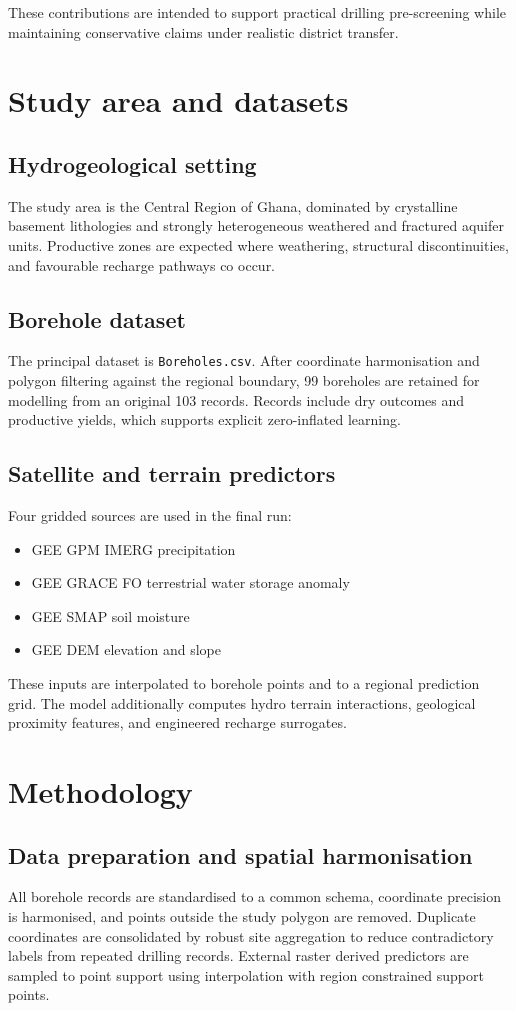 \documentclass[preprint,12pt]{elsarticle}
\begin{document}
These contributions are intended to support practical drilling pre-screening while maintaining conservative claims under realistic district transfer.

\section{Study area and datasets}
\subsection{Hydrogeological setting}
The study area is the Central Region of Ghana, dominated by crystalline basement lithologies and strongly heterogeneous weathered and fractured aquifer units. Productive zones are expected where weathering, structural discontinuities, and favourable recharge pathways co occur.

\subsection{Borehole dataset}
The principal dataset is \texttt{Boreholes.csv}. After coordinate harmonisation and polygon filtering against the regional boundary, 99 boreholes are retained for modelling from an original 103 records. Records include dry outcomes and productive yields, which supports explicit zero-inflated learning.

\subsection{Satellite and terrain predictors}
Four gridded sources are used in the final run:
\begin{itemize}
\item GEE GPM IMERG precipitation
\item GEE GRACE FO terrestrial water storage anomaly
\item GEE SMAP soil moisture
\item GEE DEM elevation and slope
\end{itemize}

These inputs are interpolated to borehole points and to a regional prediction grid. The model additionally computes hydro terrain interactions, geological proximity features, and engineered recharge surrogates.

\section{Methodology}
\subsection{Data preparation and spatial harmonisation}
All borehole records are standardised to a common schema, coordinate precision is harmonised, and points outside the study polygon are removed. Duplicate coordinates are consolidated by robust site aggregation to reduce contradictory labels from repeated drilling records. External raster derived predictors are sampled to point support using interpolation with region constrained support points.
\end{document}
